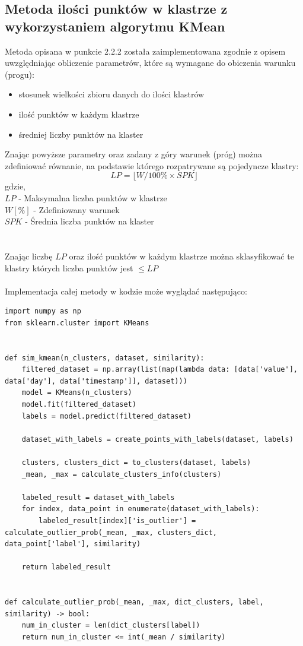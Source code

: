 \documentclass[eng,printmode]{mgr}
\begin{document}
\subsection{Metoda ilości punktów w klastrze z wykorzystaniem algorytmu KMean}
Metoda opisana w punkcie 2.2.2 została zaimplementowana zgodnie z opisem uwzględniając obliczenie parametrów, które są wymagane do obiczenia warunku (progu):
\begin{itemize}
	\item stosunek wielkości zbioru danych do ilości klastrów
	\item ilość punktów w każdym klastrze
	\item średniej liczby punktów na klaster
\end{itemize}
Znając powyższe parametry oraz zadany z góry warunek (próg) można zdefiniować równanie, na podstawie którego rozpatrywane są pojedyncze klastry:
\\
\begin{equation*}
LP = \lfloor W / 100\% \times SPK  \rfloor
\end{equation*}
gdzie,\\
$LP$ - Maksymalna liczba punktów w klastrze \\
$W[\%]$ - Zdefiniowany warunek \\
$SPK$ - Średnia liczba punktów na klaster \\
\\\\
Znając liczbę $LP$ oraz ilość punktów w każdym klastrze można sklasyfikować te klastry których liczba punktów jest $\le LP$
\\\\
Implementacja całej metody w kodzie może wyglądać następująco:
\\
\begin{lstlisting}
import numpy as np
from sklearn.cluster import KMeans


def sim_kmean(n_clusters, dataset, similarity):
    filtered_dataset = np.array(list(map(lambda data: [data['value'],       data['day'], data['timestamp']], dataset)))
    model = KMeans(n_clusters)
    model.fit(filtered_dataset)
    labels = model.predict(filtered_dataset)

    dataset_with_labels = create_points_with_labels(dataset, labels)

    clusters, clusters_dict = to_clusters(dataset, labels)
    _mean, _max = calculate_clusters_info(clusters)

    labeled_result = dataset_with_labels
    for index, data_point in enumerate(dataset_with_labels):
        labeled_result[index]['is_outlier'] = calculate_outlier_prob(_mean, _max, clusters_dict, data_point['label'], similarity)

    return labeled_result


def calculate_outlier_prob(_mean, _max, dict_clusters, label, similarity) -> bool:
    num_in_cluster = len(dict_clusters[label])
    return num_in_cluster <= int(_mean / similarity)
\end{lstlisting}
\end{document}
